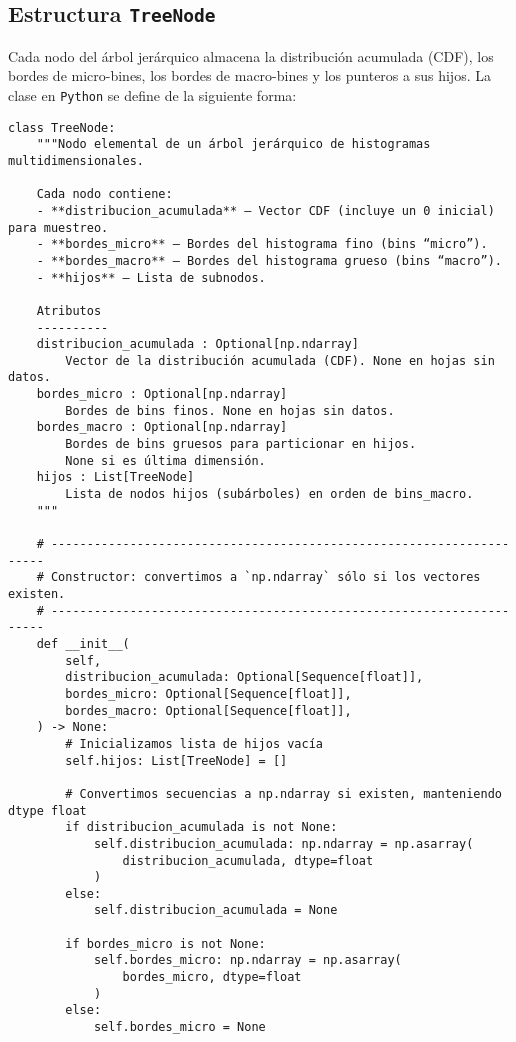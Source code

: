 \subsection{Estructura \texttt{TreeNode}}\label{subsec:treenode}

Cada nodo del árbol jerárquico almacena la distribución acumulada (CDF), los bordes de micro-bines, los bordes de macro-bines y los punteros a sus hijos. La clase en \texttt{Python} se define de la siguiente forma:

\begin{verbatim}
class TreeNode:
    """Nodo elemental de un árbol jerárquico de histogramas multidimensionales.

    Cada nodo contiene:
    - **distribucion_acumulada** – Vector CDF (incluye un 0 inicial) para muestreo.
    - **bordes_micro** – Bordes del histograma fino (bins “micro”).
    - **bordes_macro** – Bordes del histograma grueso (bins “macro”).
    - **hijos** – Lista de subnodos.

    Atributos
    ----------
    distribucion_acumulada : Optional[np.ndarray]
        Vector de la distribución acumulada (CDF). None en hojas sin datos.
    bordes_micro : Optional[np.ndarray]
        Bordes de bins finos. None en hojas sin datos.
    bordes_macro : Optional[np.ndarray]
        Bordes de bins gruesos para particionar en hijos. 
        None si es última dimensión.
    hijos : List[TreeNode]
        Lista de nodos hijos (subárboles) en orden de bins_macro.
    """

    # ---------------------------------------------------------------------
    # Constructor: convertimos a `np.ndarray` sólo si los vectores existen.
    # ---------------------------------------------------------------------
    def __init__(
        self,
        distribucion_acumulada: Optional[Sequence[float]],
        bordes_micro: Optional[Sequence[float]],
        bordes_macro: Optional[Sequence[float]],
    ) -> None:
        # Inicializamos lista de hijos vacía
        self.hijos: List[TreeNode] = []

        # Convertimos secuencias a np.ndarray si existen, manteniendo dtype float
        if distribucion_acumulada is not None:
            self.distribucion_acumulada: np.ndarray = np.asarray(
                distribucion_acumulada, dtype=float
            )
        else:
            self.distribucion_acumulada = None

        if bordes_micro is not None:
            self.bordes_micro: np.ndarray = np.asarray(
                bordes_micro, dtype=float
            )
        else:
            self.bordes_micro = None


\end{verbatim}
